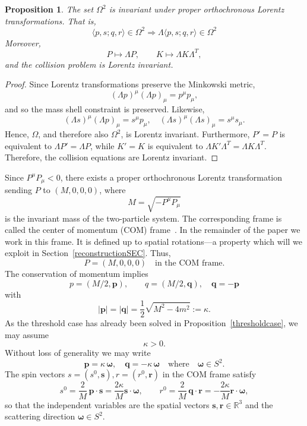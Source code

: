 \documentclass[12pt]{article}
\theoremstyle{plain}
\newtheorem{proposition}[theorem]{Proposition}
\theoremstyle{definition}
\newcommand{\R}{\mathbb{R}}
\begin{document}
\begin{proposition}
The set $\Omega^2$ is invariant under proper orthochronous Lorentz transformations. That is, 
\[
\langle p,s;q,r\rangle\in\Omega^2\Rightarrow \Lambda\langle p,s;q,r\rangle \in\Omega^2
\]
Moreover,
\[
P\mapsto\Lambda P,\qquad K\mapsto\Lambda K\Lambda^T,
\]
and the collision problem is Lorentz invariant.
\end{proposition}

\begin{proof}
Since Lorentz transformations preserve the Minkowski metric, 
\[
(\Lambda p)^\mu(\Lambda p)_\mu=p^\mu p_\mu,
\]
and so the mass shell constraint is preserved.
Likewise,
\[
(\Lambda s)^\mu(\Lambda p)_\mu=s^\mu p_\mu,\quad
(\Lambda s)^\mu(\Lambda s)_\mu=s^\mu s_\mu.
\]
Hence, $\Omega$, and therefore also $\Omega^2$, is Lorentz invariant.
Furthermore, $P'=P$ is equivalent to $\Lambda P'=\Lambda P$, 
while $K'=K$ is equivalent to $\Lambda K'\Lambda^T=\Lambda K\Lambda^T$.
Therefore, the collision equations are Lorentz invariant.
\end{proof}

Since $P^\mu P_\mu<0$,
there exists a proper orthochronous Lorentz transformation sending $P$ to $(M,0,0,0)$, where
\[
M=\sqrt{-P^\mu P_\mu}
\]
is the invariant mass of the two-particle system.
The corresponding frame is called the center of momentum (COM) frame~\cite{Groot}.  In the remainder of the paper we work in this frame. It is defined up to spatial rotations---a property which will we exploit in Section~\ref{reconstructionSEC}. Thus,
\[
P=(M,0,0,0)\quad\text{in the COM frame.}
\]
The conservation of momentum implies
\[
p=(M/2,\bm p),\qquad q=(M/2,\bm q),\quad \bm q=-\bm p
\]
with
\begin{equation}\label{kappa}
|\bm p|=|\bm q|=\frac{1}{2}\sqrt{M^2-4m^2}:=\kappa.
\end{equation}
As the threshold case has already been solved in Proposition~\ref{thresholdcase}, we may assume 
\[
\kappa>0.
\]
Without loss of generality we may write
\begin{equation}\label{p}
\bm p=\kappa\,\bm \omega ,\quad \bm q=-\kappa\,\bm\omega \quad \text{where}\quad \bm \omega \in S^2.
\end{equation}
The spin vectors $s=(s^0,{\bm s}), r=(r^0,{\bm r})$ in the COM frame satisfy
\begin{equation}\label{s0}
s^0=\frac{2}{M}\,\bm p\cdot\bm s=\frac{2\kappa}{M}\bm s\cdot \bm \omega,
\qquad
r^0=\frac{2}{M}\,\bm q\cdot\bm r=-\frac{2\kappa}{M}\bm r\cdot \bm \omega,
\end{equation}
so that the independent variables are the spatial vectors $\bm s, \bm r\in\R^3$ and the scattering direction $\bm \omega\in S^2$.
\end{document}
